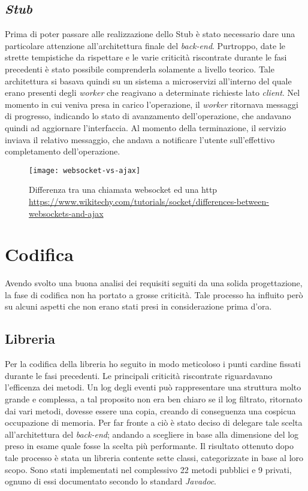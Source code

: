 \subsection{\textit{Stub}}
Prima di poter passare alle realizzazione dello Stub è stato necessario dare una particolare attenzione all'architettura finale del \textit{back-end}. Purtroppo, date le strette tempistiche da rispettare e le varie criticità riscontrate durante le fasi precedenti è stato possibile comprenderla solamente a livello teorico. Tale architettura si basava quindi su un sistema a microservizi all'interno del quale erano presenti degli \textit{worker} che reagivano a determinate richieste lato \textit{client}. Nel momento in cui veniva presa in carico l'operazione, il \textit{worker} ritornava messaggi di progresso, indicando lo stato di avanzamento dell'operazione, che andavano quindi ad aggiornare l'interfaccia. Al momento della terminazione, il servizio inviava il relativo messaggio, che andava a notificare l'utente sull'effettivo completamento dell'operazione.\\


\begin{figure}[!h] 
	\centering 
	\texttt{[image: websocket-vs-ajax]} 
	\caption{Differenza tra una chiamata websocket ed una http \url{https://www.wikitechy.com/tutorials/socket/differences-between-websockets-and-ajax}}
\end{figure}

\section{Codifica}
Avendo svolto una buona analisi dei requisiti seguiti da una solida progettazione, la  fase di codifica non ha portato a grosse criticità. Tale processo ha influito però su alcuni aspetti che non erano stati presi in considerazione prima d'ora.
\subsection{Libreria}
Per la codifica della libreria ho seguito in modo meticoloso i punti cardine fissati durante le fasi precedenti. Le principali criticità riscontrate riguardavano l'efficenza dei metodi. Un log degli eventi può rappresentare una struttura molto grande e complessa, a tal proposito non era ben chiaro se il log filtrato, ritornato dai vari metodi, dovesse essere una copia, creando di conseguenza una cospicua occupazione di memoria. Per far fronte a ciò è stato deciso di delegare tale scelta all'architettura del \textit{back-end}; andando a scegliere in base alla dimensione del log preso in esame quale fosse la scelta più performante. Il risultato ottenuto dopo tale processo è stata un libreria contente sette classi, categorizzate in base al loro scopo. Sono stati implementati nel complessivo 22 metodi pubblici e 9 privati, ognuno di essi documentato secondo lo standard \textit{Javadoc}.
